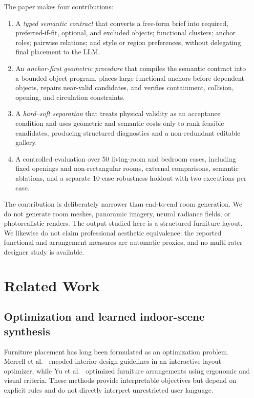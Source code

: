 \documentclass[pdflatex,sn-mathphys-num]{sn-jnl}
\begin{document}
The paper makes four contributions:

\begin{enumerate}
  \item A \emph{typed semantic contract} that converts a free-form brief into required, preferred-if-fit, optional, and excluded objects; functional clusters; anchor roles; pairwise relations; and style or region preferences, without delegating final placement to the LLM.
  \item An \emph{anchor-first geometric procedure} that compiles the semantic contract into a bounded object program, places large functional anchors before dependent objects, repairs near-valid candidates, and verifies containment, collision, opening, and circulation constraints.
  \item A \emph{hard--soft separation} that treats physical validity as an acceptance condition and uses geometric and semantic costs only to rank feasible candidates, producing structured diagnostics and a non-redundant editable gallery.
  \item A controlled evaluation over 50 living-room and bedroom cases, including fixed openings and non-rectangular rooms, external comparisons, semantic ablations, and a separate 10-case robustness holdout with two executions per case.
\end{enumerate}

The contribution is deliberately narrower than end-to-end room generation. We do not generate room meshes, panoramic imagery, neural radiance fields, or photorealistic renders. The output studied here is a structured furniture layout. We likewise do not claim professional aesthetic equivalence: the reported functional and arrangement measures are automatic proxies, and no multi-rater designer study is available.

\section{Related Work}\label{sec:related-work}

\subsection{Optimization and learned indoor-scene synthesis}

Furniture placement has long been formulated as an optimization problem. Merrell et al.~\cite{merrell2011interactive} encoded interior-design guidelines in an interactive layout optimizer, while Yu et al.~\cite{yu2011make} optimized furniture arrangements using ergonomic and visual criteria. These methods provide interpretable objectives but depend on explicit rules and do not directly interpret unrestricted user language.
\end{document}
